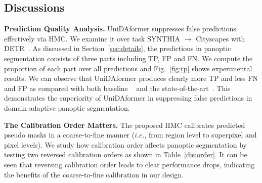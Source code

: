 \documentclass[10pt,twocolumn,letterpaper]{article}
\begin{document}
\renewcommand\arraystretch{1.}
\begin{table}[t]
\centering
\begin{footnotesize}
\end{footnotesize}
\caption{Efficiency comparison with multi-branch panoptic adaptation network CVRN~\cite{huang2021cvrn} in terms of parameter number, training speed and inference speed.}
\label{dis:cvrn_p}
\end{table}





\subsection{Discussions}
\label{sec:dis}

\noindent \textbf{Prediction Quality Analysis.} UniDAformer suppresses false predictions effectively via HMC. We examine it over task SYNTHIA $\rightarrow$ Cityscapes with DETR~\cite{carion2020detr}. As discussed in Section~\ref{sec:details}, the predictions in panoptic segmentation consists of three parts including TP, FP and FN. We compute the proportion of each part over all predictions and Fig.~\ref{fig:tp} shows experimental results. We can observe that UniDAformer produces clearly more TP and less FN and FP as compared with both baseline ~\cite{carion2020detr} and the state-of-the-art~\cite{guan2021scale,huang2021cvrn}. This demonstrates the superiority of UniDAformer in suppressing false predictions in domain adaptive panoptic segmentation.

\noindent \textbf{The Calibration Order Matters.} The proposed HMC calibrates predicted pseudo masks in a coarse-to-fine manner ($i.e.$, from region level to superpixel and pixel levels). We study how calibration order affects panoptic segmentation by testing two reversed calibration orders as shown in Table~\ref{dis:order}. It can be seen that reversing calibration order leads to clear performance drops, indicating the benefits of the coarse-to-fine calibration in our design.
\end{document}
